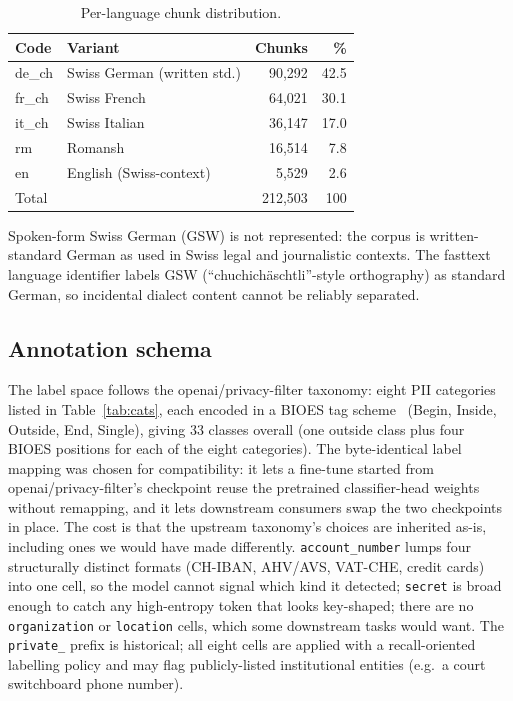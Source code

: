 \documentclass[sigconf,nonacm]{acmart}
\begin{document}
\begin{table}[h]
\centering
\caption{Per-language chunk distribution.}
\label{tab:lang-dist}
\small
\begin{tabular}{l l r r}
\toprule
Code   & Variant                       & Chunks & \% \\
\midrule
de\_ch & Swiss German (written std.)   & 90{,}292 & 42.5 \\
fr\_ch & Swiss French                  & 64{,}021 & 30.1 \\
it\_ch & Swiss Italian                 & 36{,}147 & 17.0 \\
rm     & Romansh                       & 16{,}514 & ~7.8 \\
en     & English (Swiss-context)       & ~5{,}529 & ~2.6 \\
\midrule
\multicolumn{2}{l}{Total}              & 212{,}503 & 100 \\
\bottomrule
\end{tabular}
\end{table}

Spoken-form Swiss German (GSW) is not represented: the corpus is
written-standard German as used in Swiss legal and journalistic
contexts. The fasttext language identifier labels GSW
(``chuchichäschtli''-style orthography) as standard German, so
incidental dialect content cannot be reliably separated.

\subsection{Annotation schema}

The label space follows the \textsf{openai/privacy-filter} taxonomy:
eight PII categories listed in Table~\ref{tab:cats}, each encoded in a
BIOES tag scheme~\cite{ratinov2009design} (Begin, Inside, Outside, End,
Single), giving 33 classes overall (one outside class plus four BIOES
positions for each of the eight categories). The byte-identical label
mapping was chosen for compatibility: it lets a fine-tune started
from \textsf{openai/privacy-filter}'s checkpoint reuse the pretrained
classifier-head weights without remapping, and it lets downstream
consumers swap the two checkpoints in place. The cost is that the
upstream taxonomy's choices are inherited as-is, including ones we
would have made differently. \texttt{account\_number} lumps four
structurally distinct formats (CH-IBAN, AHV/AVS, VAT-CHE, credit
cards) into one cell, so the model cannot signal which kind it
detected; \texttt{secret} is broad enough to catch any high-entropy
token that looks key-shaped; there are no \texttt{organization} or
\texttt{location} cells, which some downstream tasks would want. The
\texttt{private\_} prefix is historical; all eight cells are applied
with a recall-oriented labelling policy and may flag publicly-listed
institutional entities (e.g.\ a court switchboard phone number).
\end{document}
